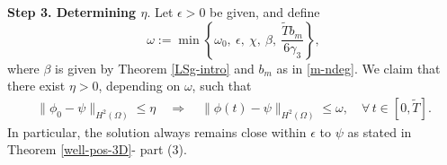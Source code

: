 \documentclass[11pt,reqno]{amsart}
\theoremstyle{remark}
\numberwithin{equation}{section}
\newcommand{\vp}{\phi}
\begin{document}
\medskip
\textbf{Step 3. Determining $\eta$}. Let $\epsilon>0$ be given, and define
\begin{equation}
\label{zeta}
\omega:=\min \left\{\omega_0, \ \epsilon,\ \chi,\ \beta,\
\frac{\widetilde{T}b_m}{6 \gamma_3}\right\},
\end{equation}
where $\beta$ is given by Theorem \ref{LSg-intro} and $b_m$ as in \eqref{m-ndeg}.
We claim that there exist $\eta>0$, depending on $\omega$, such that
\begin{align}
\label{vH2e}
\|\vp_0-\psi\|_{H^2(\Omega)}\leq \eta\quad \Longrightarrow\quad \|\vp(t)-\psi \|_{H^2(\Omega)} \leq \omega, \quad \forall \,  t\in [0,\widetilde{T}].
\end{align}
In particular, the solution always remains close within $\epsilon$ to $\psi$ as stated in Theorem \ref{well-pos-3D}- part (3).
\end{document}
